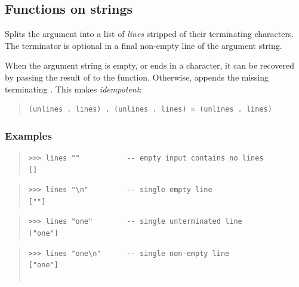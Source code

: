 \subsection{Functions on strings}
\begin{haddockdesc}
\item[\begin{tabular}{@{}l}
lines :: String -> {\char 91}String{\char 93}
\end{tabular}]
{\haddockbegindoc
Splits the argument into a list of \emph{lines} stripped of their terminating
  characters.  The  terminator is optional in a final non-empty
 line of the argument string.\par
When the argument string is empty, or ends in a  character, it can be
 recovered by passing the result of  to the  function.
 Otherwise,  appends the missing terminating .  This makes
  \emph{idempotent}:\par
\begin{quote}
{\haddockverb\begin{verbatim}
(unlines . lines) . (unlines . lines) = (unlines . lines)\end{verbatim}}
\end{quote}
\subsubsection*{\textbf{Examples}}
\begin{quote}
{\haddockverb\begin{verbatim}
>>> lines ""           -- empty input contains no lines
[]

\end{verbatim}}
\end{quote}
\begin{quote}
{\haddockverb\begin{verbatim}
>>> lines "\n"         -- single empty line
[""]

\end{verbatim}}
\end{quote}
\begin{quote}
{\haddockverb\begin{verbatim}
>>> lines "one"        -- single unterminated line
["one"]

\end{verbatim}}
\end{quote}
\begin{quote}
{\haddockverb\begin{verbatim}
>>> lines "one\n"      -- single non-empty line
["one"]


\end{verbatim}}
\end{quote}}
\end{haddockdesc}
